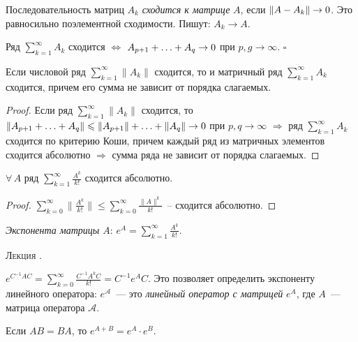 \documentclass[a4paper]{article}
\newcounter{lec}
\renewcommand{\thelec}{\Roman{lec}}
\newcommand*{\lecture}[1]{\refstepcounter{lec}\vspace{20pt}
\begin{center}{\rmfamily\textsc{Лекция \thelec. \\ \textbf{#1}}}\vspace{5pt}
\end{center}}
\newcommand*{\p}[1]{#1\nobreak\discretionary{}{\hbox{$\mathsurround=0pt #1$}}{}}
\begin{document}
Последовательность матриц $A_k$ \emph{сходится к матрице} $A$, если
$\|A\p-A_k\|\to 0$. Это равносильно поэлементной сходимости. Пишут:
$A_k\to A$.

\begin{theorem}
Ряд $\sum\limits_{k=1}^\infty A_k$ сходится $\Leftrightarrow$
$A_{p+1}+\ldots\p+A_q\to 0$ при $p,g\to\infty$. $\square$
\end{theorem}

\begin{prop}
Если числовой ряд $\sum\limits_{k=1}^\infty \|A_k\|$ сходится, то и
матричный ряд $\sum\limits_{k=1}^\infty A_k$ сходится, причем его
сумма не зависит от порядка слагаемых.
\end{prop}

\begin{proof}
Если ряд $\sum\limits_{k=1}^\infty \|A_k\|$ сходится, то
$\|A_{p+1}+\ldots+A_q\|\p\leqslant\|A_{p+1}\|+\ldots+\|A_q\|\to 0$
при $p,q\to \infty$ $\Rightarrow$ ряд $\sum\limits_{k=1}^\infty A_k$
сходится по критерию Коши, причем каждый ряд из матричных элементов
сходится абсолютно $\Rightarrow$ сумма ряда не зависит от порядка
слагаемых.
\end{proof}

\begin{theorem}
$\forall \, A$ ряд $\sum\limits_{k=1}^\infty \frac{A^k}{k!}$
сходится абсолютно.
\end{theorem}

\begin{proof}
$\sum\limits_{k=0}^\infty \|\frac{A^k}{k!}\|\leqslant
\sum\limits_{k=0}^\infty \frac{\|A\|^k}{k!}$~-- сходится абсолютно.
\end{proof}

\emph{Экспонента матрицы $A$}: $e^A=\sum\limits_{k=1}^\infty
\frac{A^k}{k!}$.
\lecture{}

$e^{C^{-1}AC}=\sum\limits_{k=0}^\infty
\frac{C^{-1}A^kC}{k!}=C^{-1}e^AC$. Это позволяет определить
экспоненту линейного оператора: $e^\mathcal{A}$~--- это
\emph{линейный оператор с матрицей} $e^A$, где $A$~--- матрица
оператора $\mathcal{A}$.

\begin{lemma}
Если $AB=BA$, то $e^{A+B}=e^A\cdot e^B$.
\end{lemma}
\end{document}
